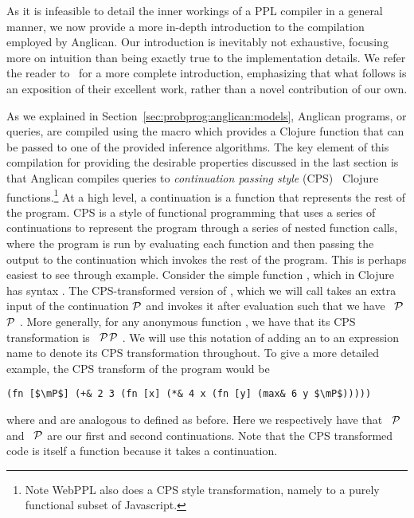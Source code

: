 As it is infeasible to detail the inner workings of a PPL compiler in a general
manner, we now provide a more in-depth introduction to the compilation
employed by Anglican.  Our introduction is inevitably not exhaustive, focusing more on
intuition than being exactly true to the implementation details. We refer the reader
to~\citep{tolpin2016design} for a more complete introduction, emphasizing that what
follows is an exposition of their excellent work, rather than a novel contribution of our own.

As we explained in Section~\ref{sec:probprog:anglican:models},
Anglican programs, or queries, are compiled using the macro \query which provides a
Clojure function that can be passed to one of the provided inference algorithms.
The key element of this compilation for providing the desirable properties discussed
in the last section is that
Anglican compiles queries to \emph{continuation passing style} (CPS)~\citep{appel1989continuation}
Clojure functions.\footnote{Note WebPPL also does a CPS style transformation, 
	namely to a purely functional subset of Javascript.}
At a high level, a continuation is a function that represents the rest of the
program.  CPS is a style of functional programming that uses a series of continuations
to represent the program through a series of nested function calls, where the program
is run by evaluating each function and then passing the output to the continuation
which invokes the rest of the program.  This is perhaps easiest to see through
example.  Consider the simple function \clj{+}, which in Clojure has syntax .  The
CPS-transformed version of \clj{+}, which we will call \clj{+&} takes an extra input
of the continuation $\mathcal{P}$ and invokes it after evaluation such that we have
\clj{(defn +& [a b } ~$\mathcal{P}$\clj{] (}$\mathcal{P}$ .  More generally, for any anonymous function , we have
that its CPS transformation is \clj{(defn f& [args} ~$\mathcal{P}$\clj{] (}$\mathcal{P}$ .
  We 
will use this notation of adding an \clj{&} to an expression name to denote its CPS transformation throughout.
To give a more detailed example, the CPS transform of the program  would be
\begin{lstlisting}[basicstyle=\ttfamily\small,frame=none]
  (fn [$\mP$] (+& 2 3 (fn [x] (*& 4 x (fn [y] (max& 6 y $\mP$)))))
\end{lstlisting}\vspace{-8pt}
where \clj{*&} and
 are analogous to \clj{+&} defined as before.
Here we respectively have that ~$\mathcal{P}$\clj{))))} and
~$\mathcal{P}$\clj{))} are our first and second continuations.  Note that the CPS 
transformed code is itself a function because it takes a continuation.  

